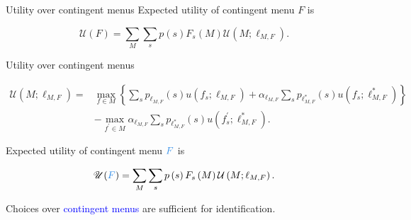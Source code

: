 \documentclass[usenames,dvipsnames,aspectratio=169,11pt, envcountsect, handout]{beamer}
\begin{document}
\begin{frame}{Utility over contingent menus}
	\vfill
	Expected utility of contingent menu \( F \) is

	\vfill
	\[
		\mathscr{U}(F)= \sum_{M} \sum_{s} p \left( s \right) F_{s} \left( M \right) \mathcal{U} \left(M ; \ell_{M, F} \right) .
	\]

\end{frame}

\begin{frame}[noframenumbering]{Utility over contingent menus}

	{\begingroup

		\[
			\begin{aligned}
				\mathcal{U} \left(M ; \ell_{M, F} \right) = & \max _{f \in M}\left\{\sum_{s} p_{\ell_{M, F}} \left( s \right) u \left( f_{s} ; \ell_{M, F} \right) + \alpha_{\ell_{M, F}} \sum_{s} p_{\ell^{*}_{M, F}} \left( s \right) u \left( f_{s} ; \ell^{*}_{M, F} \right) \right\} \\
				                                            & -\max _{f^{\prime} \in M} \alpha _{\ell_{M, F}} \sum_{s} p_{\ell^{*}_{M, F}} \left( s \right) u\left(f^{\prime}_{s} ; \ell^{*}_{M, F} \right) .
			\end{aligned}
		\]
		\endgroup}

	Expected utility of contingent menu \( \textcolor{blue}{F} \) is

	\vfill
	\[
		\mathscr{U}(\textcolor{blue}{F})= \sum_{M} \sum_{s} p \left( s \right) F_{s} \left( M \right) \mathcal{U} \left(M ; \ell_{M, F} \right) .
	\]

	\vfill

	Choices over \textcolor{blue}{contingent menus} are sufficient for identification.

\end{frame}
\end{document}
